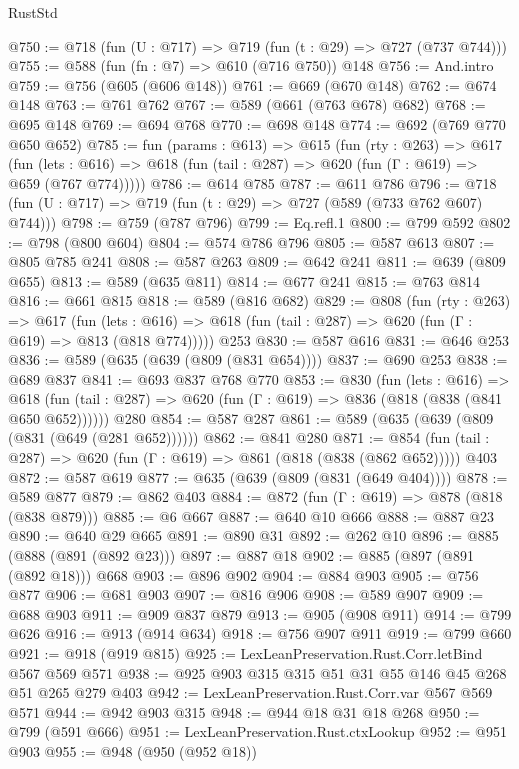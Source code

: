 \begin{lexlean}{RustStd}
\begin{coremodule}
{\begin{coremodule}
{{{{{{{{{@750 := @718 (fun (U : @717) => @719 (fun (t : @29) => @727 (@737 @744)))
@755 := @588 (fun (fn : @7) => @610 (@716 @750)) @148
@756 := And.intro
@759 := @756 (@605 (@606 @148))
@761 := @669 (@670 @148)
@762 := @674 @148
@763 := @761 @762
@767 := @589 (@661 (@763 @678) @682)
@768 := @695 @148
@769 := @694 @768
@770 := @698 @148
@774 := @692 (@769 @770 @650 @652)
@785 := fun (params : @613) =>
  @615
    (fun (rty : @263) =>
    @617
      (fun (lets : @616) => @618 (fun (tail : @287) => @620 (fun (Γ : @619) => @659 (@767 @774)))))
@786 := @614 @785
@787 := @611 @786
@796 := @718 (fun (U : @717) => @719 (fun (t : @29) => @727 (@589 (@733 @762 @607) @744)))
@798 := @759 (@787 @796)
@799 := Eq.refl.{1}
@800 := @799 @592
@802 := @798 (@800 @604)
@804 := @574 @786 @796
@805 := @587 @613
@807 := @805 @785 @241
@808 := @587 @263
@809 := @642 @241
@811 := @639 (@809 @655)
@813 := @589 (@635 @811)
@814 := @677 @241
@815 := @763 @814
@816 := @661 @815
@818 := @589 (@816 @682)
@829 := @808
    (fun (rty : @263) =>
    @617
      (fun (lets : @616) => @618 (fun (tail : @287) => @620 (fun (Γ : @619) => @813 (@818 @774)))))
    @253
@830 := @587 @616
@831 := @646 @253
@836 := @589 (@635 (@639 (@809 (@831 @654))))
@837 := @690 @253
@838 := @689 @837
@841 := @693 @837 @768 @770
@853 := @830
    (fun (lets : @616) =>
    @618 (fun (tail : @287) => @620 (fun (Γ : @619) => @836 (@818 (@838 (@841 @650 @652))))))
    @280
@854 := @587 @287
@861 := @589 (@635 (@639 (@809 (@831 (@649 (@281 @652))))))
@862 := @841 @280
@871 := @854 (fun (tail : @287) => @620 (fun (Γ : @619) => @861 (@818 (@838 (@862 @652))))) @403
@872 := @587 @619
@877 := @635 (@639 (@809 (@831 (@649 @404))))
@878 := @589 @877
@879 := @862 @403
@884 := @872 (fun (Γ : @619) => @878 (@818 (@838 @879)))
@885 := @6 @667
@887 := @640 @10 @666
@888 := @887 @23
@890 := @640 @29 @665
@891 := @890 @31
@892 := @262 @10
@896 := @885 (@888 (@891 (@892 @23)))
@897 := @887 @18
@902 := @885 (@897 (@891 (@892 @18))) @668
@903 := @896 @902
@904 := @884 @903
@905 := @756 @877
@906 := @681 @903
@907 := @816 @906
@908 := @589 @907
@909 := @688 @903
@911 := @909 @837 @879
@913 := @905 (@908 @911)
@914 := @799 @626
@916 := @913 (@914 @634)
@918 := @756 @907 @911
@919 := @799 @660
@921 := @918 (@919 @815)
@925 := LexLeanPreservation.Rust.Corr.letBind @567 @569 @571
@938 := @925 @903 @315 @315 @51 @31 @55 @146 @45 @268 @51 @265 @279 @403
@942 := LexLeanPreservation.Rust.Corr.var @567 @569 @571
@944 := @942 @903 @315
@948 := @944 @18 @31 @18 @268
@950 := @799 (@591 @666)
@951 := LexLeanPreservation.Rust.ctxLookup
@952 := @951 @903
@955 := @948 (@950 (@952 @18))
}}}}}}}}}
\end{coremodule}}
\end{coremodule}
\end{lexlean}
